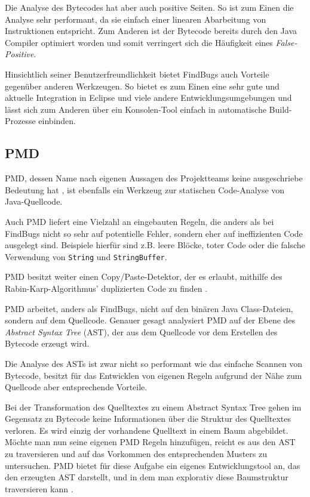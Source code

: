 Die Analyse des Bytecodes hat aber auch positive Seiten. So ist zum Einen die Analyse sehr performant, da sie einfach einer linearen Abarbeitung von Instruktionen entspricht. Zum Anderen ist der Bytecode bereits durch den Java Compiler optimiert worden und somit verringert sich die Häufigkeit eines \textit{False-Positive}.

Hinsichtlich seiner Benutzerfreundlichkeit bietet FindBugs auch Vorteile gegenüber anderen Werkzeugen. So bietet es zum Einen eine sehr gute und aktuelle Integration in Eclipse und viele andere Entwicklungsumgebungen und lässt sich zum Anderen über ein Konsolen-Tool einfach in automatische Build-Prozesse einbinden.


\subsection{PMD}
PMD, dessen Name nach eigenen Aussagen des Projektteams keine ausgeschriebe Bedeutung hat \citep{pmdBedeutung}, ist ebenfalls ein Werkzeug zur statischen Code-Analyse von Java-Quellcode. 

Auch PMD liefert eine Vielzahl an eingebauten Regeln, die anders als bei FindBugs nicht so sehr auf potentielle Fehler, sondern eher auf ineffizienten Code ausgelegt sind. Beispiele hierfür sind z.B. leere Blöcke, toter Code oder die falsche Verwendung von \verb=String= und \verb=StringBuffer=. 

PMD besitzt weiter einen Copy/Paste-Detektor, der es erlaubt, mithilfe des Rabin-Karp-Algorithmus' duplizierten Code zu finden \citep{pmdRabin}.

PMD arbeitet, anders als FindBugs, nicht auf den binären Java Class-Dateien, sondern auf dem Quellcode. Genauer gesagt analysiert PMD auf der Ebene des \textit{Abstract Syntax Tree} (AST), der aus dem Quellcode vor dem Erstellen des Bytecode erzeugt wird. 

Die Analyse des ASTs ist zwar nicht so performant wie das einfache Scannen von Bytecode, besitzt für das Entwicklen von eigenen Regeln aufgrund der Nähe zum Quellcode aber entsprechende Vorteile.

Bei der Transformation des Quelltextes zu einem Abstract Syntax Tree gehen im Gegensatz zu Bytecode keine Informationen über die Struktur des Quelltextes verloren. Es wird einzig der vorhandene Quelltext in einem Baum abgebildet. 
Möchte man nun seine eigenen PMD Regeln hinzufügen, reicht es aus den AST zu traversieren und auf das Vorkommen des entsprechenden Musters zu untersuchen. PMD bietet für diese Aufgabe ein eigenes Entwicklungstool an, das den erzeugten AST darstellt, und in dem man explorativ diese Baumstruktur traversieren kann \citep{pmdAST}.

